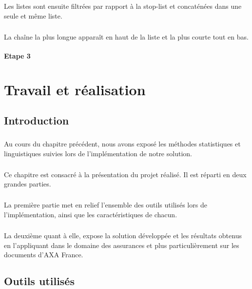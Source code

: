\documentclass[12pt, a4paper, oneside]{book}
\begin{document}
\paragraph{}
Les listes sont ensuite filtrées par rapport à la stop-list et concaténées dans une seule et même liste.
\paragraph{}
La chaîne la plus longue apparaît en haut de la liste et la plus courte tout en bas.

\subsubsection{Etape 3}



\chapter{Travail et réalisation}

\section{Introduction}
\paragraph{}

Au cours du chapitre précédent, nous avons exposé les méthodes statistiques et linguistiques suivies lors de l'implémentation de notre solution.
\paragraph{}
Ce chapitre est consacré à la présentation du projet réalisé. Il est réparti en deux grandes parties.
\paragraph{}
La première partie met en relief l'ensemble des outils utilisés lors de l'implémentation, ainsi que les caractéristiques de chacun.
\paragraph{}
La deuxième quant à elle, expose la solution développée et les résultats obtenus en l'appliquant dans le domaine des assurances et plus particulièrement sur les documents d'AXA France.

\section{Outils utilisés}
\end{document}
